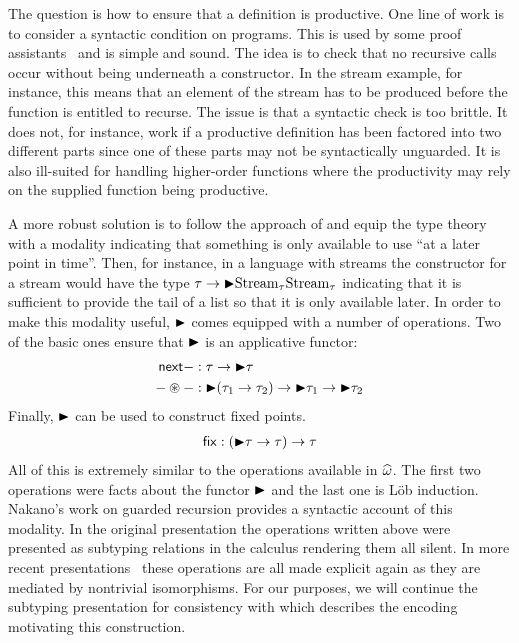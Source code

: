 The question is how to ensure that a definition is productive. One
line of work is to consider a syntactic condition on programs. This is
used by some proof assistants~\citep{TODO-COQ} and is simple and
sound. The idea is to check that no recursive calls occur without
being underneath a constructor. In the stream example, for instance,
this means that an element of the stream has to be produced before the
function is entitled to recurse. The issue is that a syntactic check
is too brittle. It does not, for instance, work if a productive
definition has been factored into two different parts since one of
these parts may not be syntactically unguarded. It is also ill-suited
for handling higher-order functions where the productivity may rely on
the supplied function being productive.

A more robust solution is to follow the approach of
\citet{TODO-NAKANO} and equip the type theory with a modality
indicating that something is only available to use ``at a later point
in time''. Then, for instance, in a language with streams the
constructor for a stream would have the type
$\tau \to {\blacktriangleright} \mathrm{Stream}_\tau{\mathrm{Stream}_\tau}$
indicating that it is sufficient to provide the tail of a list so that
it is only available later. In order to make this modality useful,
${\blacktriangleright}$ comes equipped with a number of operations. Two of the basic
ones ensure that ${\blacktriangleright}$ is an applicative functor:
\begin{align*}
  \mathsf{next}{-} &: \tau \to {\blacktriangleright} \tau\\
  - \circledast - &: {\blacktriangleright} (\tau_1 \to \tau_2) \to {\blacktriangleright} \tau_1 \to {\blacktriangleright} \tau_2
\end{align*}
Finally, ${\blacktriangleright}$ can be used to construct fixed points.
\begin{align*}
  \mathsf{fix}{} : ({\blacktriangleright} \tau \to \tau) \to \tau
\end{align*}
All of this is extremely similar to the operations available in
$\widehat{\omega}$. The first two operations were facts about the
functor ${\blacktriangleright}$ and the last one is L\"ob induction. Nakano's work on
guarded recursion provides a syntactic account of this modality. In
the original presentation the operations written above were
presented as subtyping relations in the calculus rendering them all
silent. In more recent presentations~\citep{TODO-GUARDED} these
operations are all made explicit again as they are mediated by
nontrivial isomorphisms. For our purposes, we will continue the
subtyping presentation for consistency with \citet{TODO-POTTIER} which
describes the encoding motivating this construction.


